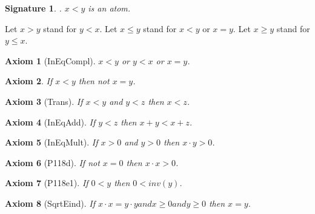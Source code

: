 \documentclass{article}
\newenvironment{forthel}{\begin{leftbar}}{\end{leftbar}}
\newtheorem{axiom}{Axiom}
\newtheorem{signature}{Signature}
\begin{document}
\begin{forthel}


\begin{signature}. $x < y$ is an atom.

\end{signature}
Let $x  >  y$ stand for $y  <  x$.\newline
Let $x  \leq  y$ stand for $x < y$ or $x=y$.\newline
Let $x  \geq  y$ stand for $y  \leq  x$.

\begin{axiom}[InEqCompl] $x < y$ or $y < x$ or $x = y$.

\end{axiom}
\begin{axiom} If $x < y$ then not $x=y$.

\end{axiom}

\begin{axiom}[Trans] If $x < y$ and $y < z$ then $x < z$.

\end{axiom}


\begin{axiom}[InEqAdd] If $y < z$ then $x+y < x+z$.

\end{axiom}
\begin{axiom}[InEqMult] If $x > 0$ and $y > 0$ then $x \cdot y > 0$.

\end{axiom}


\begin{axiom}[P118d] If not $x = 0$ then $x \cdot x  >  0$.

\end{axiom}
\begin{axiom}[P118e1] If $0 < y$ then $0  <  inv(y)$.

\end{axiom}

\begin{axiom}[SqrtEind] If $x \cdot x = y \cdot y and x \geq 0 and y  \geq  0$ then $x=y$.

\end{axiom}


\end{forthel}
\end{document}
